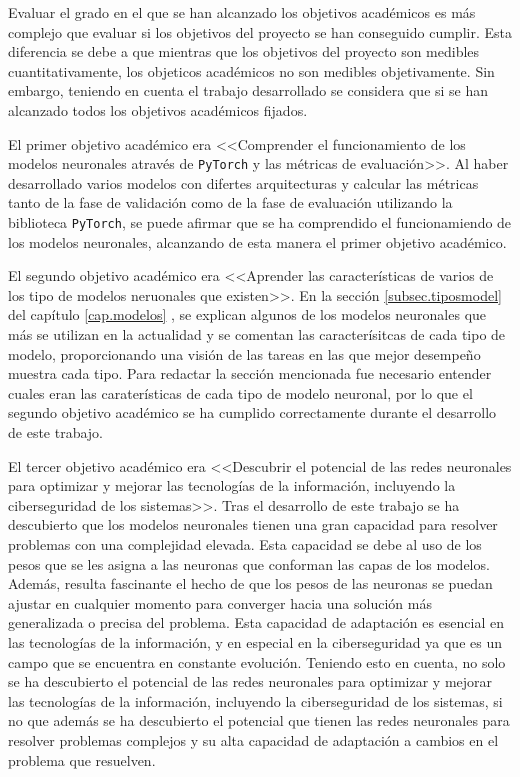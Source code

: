 Evaluar el grado en el que se han alcanzado los objetivos académicos es más complejo que evaluar si los objetivos del proyecto se han conseguido cumplir. Esta diferencia se debe a que mientras que los objetivos del proyecto son medibles cuantitativamente, los objeticos académicos no son medibles objetivamente. Sin embargo, teniendo en cuenta el trabajo desarrollado se considera que si se han alcanzado todos los objetivos académicos fijados.

El primer objetivo académico era <<Comprender el funcionamiento de los modelos neuronales através de \texttt{PyTorch} y las métricas de evaluación>>. Al haber desarrollado varios modelos con difertes arquitecturas y calcular las métricas tanto de la fase de validación como de la fase de evaluación utilizando la biblioteca \texttt{PyTorch}, se puede afirmar que se ha comprendido el funcionamiendo de los modelos neuronales, alcanzando de esta manera el primer objetivo académico.

El segundo objetivo académico era <<Aprender las características de varios de los tipo de modelos neruonales que existen>>. En la sección \ref{subsec.tiposmodel} del capítulo \ref{cap.modelos} , se explican algunos de los modelos neuronales que más se utilizan en la actualidad y se comentan las caracterísitcas de cada tipo de modelo, proporcionando una visión de las tareas en las que mejor desempeño muestra cada tipo. Para redactar la sección mencionada fue necesario entender cuales eran las caraterísticas de cada tipo de modelo neuronal, por lo que el segundo objetivo académico se ha cumplido correctamente durante el desarrollo de este trabajo.

El tercer objetivo académico era <<Descubrir el potencial de las redes neuronales para optimizar y mejorar las tecnologías de la información, incluyendo la ciberseguridad de los sistemas>>. Tras el desarrollo de este trabajo se ha descubierto que los modelos neuronales tienen una gran capacidad para resolver problemas con una complejidad elevada. Esta capacidad se debe al uso de los pesos que se les asigna a las neuronas que conforman las capas de los modelos. Además, resulta fascinante el hecho de que los pesos de las neuronas se puedan ajustar en cualquier momento para converger hacia una solución más generalizada o precisa del problema. Esta capacidad de adaptación es esencial en las tecnologías de la información, y en especial en la ciberseguridad ya que es un campo que se encuentra en constante evolución. Teniendo esto en cuenta, no solo se ha descubierto el potencial de las redes neuronales para optimizar y mejorar las tecnologías de la información, incluyendo la ciberseguridad de los sistemas, si no que además se ha descubierto el potencial que tienen las redes neuronales para resolver problemas complejos y su alta capacidad de adaptación a cambios en el problema que resuelven.



